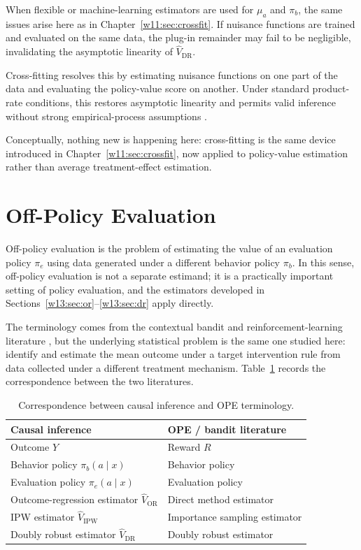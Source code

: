 \documentclass[master.tex]{subfiles}
\begin{document}
When flexible or machine-learning estimators are used for $\mu_a$ and $\pi_b$, the same issues arise here as in Chapter~\ref{w11:sec:crossfit}.  If nuisance functions are trained and evaluated on the same data, the plug-in remainder may fail to be negligible, invalidating the asymptotic linearity of $\hat V_{\mathrm{DR}}$.

Cross-fitting resolves this by estimating nuisance functions on one part of the data and evaluating the policy-value score on another.  Under standard product-rate conditions, this restores asymptotic linearity and permits valid inference without strong empirical-process assumptions \citep{chernozhukov2018double}.

Conceptually, nothing new is happening here: cross-fitting is the same device introduced in Chapter~\ref{w11:sec:crossfit}, now applied to policy-value estimation rather than average treatment-effect estimation.

\section{Off-Policy Evaluation}
\label{w13:sec:ope}

Off-policy evaluation is the problem of estimating the value of an evaluation policy $\pi_e$ using data generated under a different behavior policy $\pi_b$.  In this sense, off-policy evaluation is not a separate estimand; it is a practically important setting of policy evaluation, and the estimators developed in Sections~\ref{w13:sec:or}--\ref{w13:sec:dr} apply directly.

The terminology comes from the contextual bandit and reinforcement-learning literature \citep{dudik2014doubly,uehara2022review}, but the underlying statistical problem is the same one studied here: identify and estimate the mean outcome under a target intervention rule from data collected under a different treatment mechanism.  Table~\ref{w13:tab:terminology} records the correspondence between the two literatures.

\begin{table}[ht]
\centering
\renewcommand{\arraystretch}{1.2}
\begin{tabular}{ll}
\hline
\textbf{Causal inference} & \textbf{OPE / bandit literature} \\
\hline
Outcome $Y$ & Reward $R$ \\
Behavior policy $\pi_b(a\mid x)$ & Behavior policy \\
Evaluation policy $\pi_e(a\mid x)$ & Evaluation policy \\
Outcome-regression estimator $\hat V_{\mathrm{OR}}$ & Direct method estimator \\
IPW estimator $\hat V_{\mathrm{IPW}}$ & Importance sampling estimator \\
Doubly robust estimator $\hat V_{\mathrm{DR}}$ & Doubly robust estimator \\
\hline
\end{tabular}
\caption{Correspondence between causal inference and OPE terminology.}
\label{w13:tab:terminology}
\end{table}
\end{document}

